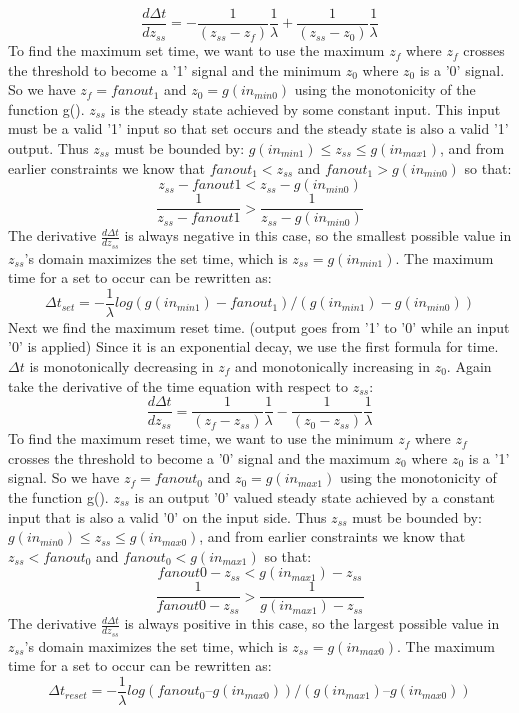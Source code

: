 \documentclass{article}
\begin{document}
\[\frac{d\Delta t}{dz_{ss}}=- \frac{1}{(z_{ss}-z_f)}\frac{1}{\lambda}+ \frac{1}{(z_{ss}-z_0)}\frac{1}{\lambda}
\]
To find the maximum set time, we want to use the maximum $z_f$ where $z_f$ crosses the threshold to become a '1' signal and the minimum $z_0$ where $z_0$ is a '0' signal.  So we have $z_f=fanout_1$ and $z_0=g(in_{min0})$ using the monotonicity of the function g().  $z_{ss}$ is the steady state achieved by some constant input.  This input must be a valid '1' input so that set occurs and the steady state is also a valid '1' output.  Thus $z_{ss}$ must be bounded by: $g(in_{min1})\leq z_{ss}\leq g(in_{max1})$, and from earlier constraints we know that $fanout_1<z_{ss}$ and $fanout_1>g(in_{min0})$ so that:
\[z_{ss}-fanout1< z_{ss}-g(in_{min0})
\]
\[\frac{1}{z_{ss}-fanout1}>\frac{1}{z_{ss}-g(in_{min0})}
\]
The derivative $\frac{d\Delta t}{dz_{ss}}$ is always negative in this case, so the smallest possible value in $z_{ss}$'s domain maximizes the set time, which is $z_{ss}=g(in_{min1})$.
The maximum time for a set to occur can be rewritten as:
\[\Delta t_{set}= - \frac{1}{\lambda} log(g(in_{min1})-fanout_1)/(g(in_{min1}) -g(in_{min0}))
\]
Next we find the maximum reset time.  (output goes from '1' to '0' while an input '0' is applied)  Since it is an exponential decay, we use the first formula for time.  $\Delta t$ is monotonically decreasing in $z_f$ and monotonically increasing in $z_0$.  Again take the derivative of the time equation with respect to $z_{ss}$:
\[\frac{d\Delta t}{dz_{ss}}= \frac{1}{(z_f-z_{ss})}\frac{1}{\lambda}- \frac{1}{(z_0-z_{ss})}\frac{1}{\lambda}
\]
To find the maximum reset time, we want to use the minimum $z_f$ where $z_f$ crosses the threshold to become a '0' signal and the maximum $z_0$ where $z_0$ is a '1' signal.  So we have $z_f=fanout_0$ and $z_0=g(in_{max1})$ using the monotonicity of the function g().  $z_{ss}$ is an output '0' valued steady state achieved by a constant input that is also a valid '0' on the input side.  Thus $z_{ss}$ must be bounded by: $g(in_{min0})\leq z_{ss}\leq g(in_{max0})$, and from earlier constraints we know that $z_{ss}<fanout_0$ and $fanout_0<g(in_{max1})$ so that:
\[fanout0-z_{ss}< g(in_{max1})-z_{ss}
\]
\[\frac{1}{fanout0-z_{ss}}>\frac{1}{g(in_{max1})-z_{ss}}
\]
The derivative $\frac{d\Delta t}{dz_{ss}}$ is always positive in this case, so the largest possible value in $z_{ss}$'s domain maximizes the set time, which is $z_{ss}=g(in_{max0})$.
The maximum time for a set to occur can be rewritten as:
\[\Delta t_{reset}= -\frac{1}{\lambda} log(fanout_0 –g(in_{max0}))/(g(in_{max1}) – g(in_{max0}))
\]
\end{document}
